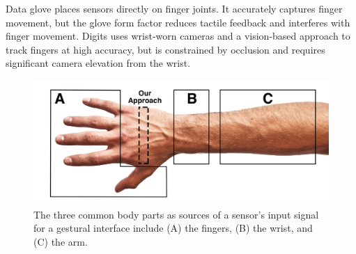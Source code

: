 \documentclass{sigchi}
\begin{document}

Data glove \cite{4539650} places sensors directly on finger joints. It accurately captures finger movement, but the glove form factor reduces tactile feedback and interferes with finger movement. Digits \cite{Kim:2012:DFI:2380116.2380139} uses wrist-worn cameras and a vision-based approach to track fingers at high accuracy, but is constrained by occlusion and requires significant camera elevation from the wrist. 

\begin{figure}
  \begin{center}
  \includegraphics[width=1\columnwidth]{figures/HandTarget.jpg}
  \caption{The three common body parts as sources of a sensor's input signal for a gestural interface include (A) the fingers, (B) the wrist, and (C) the arm.}
  \label{fig:HandTarget}
  \end{center}
\end{figure}


\end{document}
